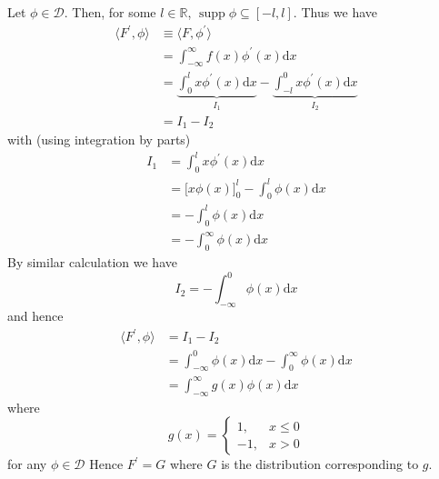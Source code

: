 \documentclass{article}
\DeclareMathOperator\supp{supp}
\begin{document}
Let $\phi \in \mathcal{D}$. Then, for some $l \in \mathbb{R}$, $\supp
\phi \subseteq [-l, l]$. Thus we have
%
\begin{align*}
    \langle F^\prime, \phi \rangle
        &\equiv \langle F, \phi^\prime \rangle \\
        &= \int_{- \infty}^{\infty} f(x) \phi^\prime(x) \mathrm{d} x \\
        &= \underbrace{\int_{0}^{l} x \phi^\prime(x) \mathrm{d} x}_{I_1}
            - \underbrace{\int_{-l}^{0} x \phi^\prime(x) \mathrm{d} x}_{I_2} \\
        &= I_1 - I_2
\end{align*}
%
with (using integration by parts)
%
\begin{align*}
    I_1 &= \int_{0}^{l} x \phi^\prime(x) \mathrm{d} x \\
        &= \big[ x \phi(x) \big]_{0}^{l} - \int_{0}^{l} \phi(x) \mathrm{d} x \\
        &= - \int_{0}^{l} \phi(x) \mathrm{d} x \\
        &= - \int_{0}^{\infty} \phi(x) \mathrm{d} x
\end{align*}
%
By similar calculation we have
%
\begin{equation*}
    I_2 = - \int_{- \infty}^{0} \phi(x) \mathrm{d} x
\end{equation*}
%
and hence
%
\begin{align*}
    \langle F^\prime, \phi \rangle
        &= I_1 - I_2 \\
        &= \int_{- \infty}^{0} \phi(x) \mathrm{d} x - \int_{0}^{\infty} \phi(x) \mathrm{d} x \\
        &= \int_{- \infty}^{\infty} g(x) \phi(x) \mathrm{d} x
\end{align*}
%
where
%
\begin{equation*}
    g(x) =
        \begin{cases}
            1, & x \leq 0 \\
            -1, & x > 0
        \end{cases}
\end{equation*}
%
for any $\phi \in \mathcal{D}$ Hence $F^\prime = G$ where $G$ is the
distribution corresponding to $g$.
\end{document}
